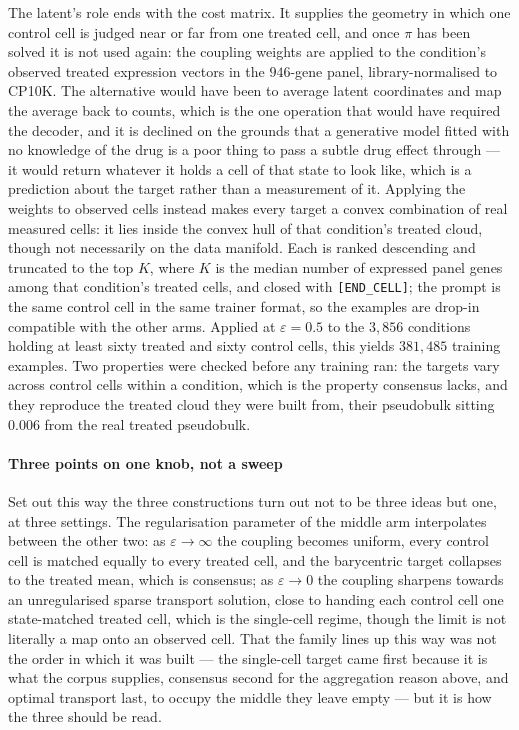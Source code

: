 The latent's role ends with the cost matrix. It supplies the geometry in which one
control cell is judged near or far from one treated cell, and once $\pi$ has been
solved it is not used again: the coupling weights are applied to the condition's
observed treated expression vectors in the $946$-gene panel, library-normalised to
CP10K. The alternative would have been to average latent coordinates and map the
average back to counts, which is the one operation that would have required the
decoder, and it is declined on the grounds that a generative model fitted with no
knowledge of the drug is a poor thing to pass a subtle drug effect through --- it
would return whatever it holds a cell of that state to look like, which is a
prediction about the target rather than a measurement of it. Applying the weights
to observed cells instead makes every target a convex combination of real measured
cells: it lies inside the convex hull of that condition's treated cloud, though not
necessarily on the data manifold. Each is ranked descending and truncated to the
top $K$, where $K$ is the median number of expressed panel genes among that
condition's treated cells, and closed with \texttt{[END\_CELL]}; the prompt is the
same control cell in the same trainer format, so the examples are drop-in
compatible with the other arms. Applied at $\varepsilon = 0.5$ to the $3{,}856$
conditions holding at least sixty treated and sixty control cells, this yields
$381{,}485$ training examples. Two properties were checked before any training ran:
the targets vary across control cells within a condition, which is the property
consensus lacks, and they reproduce the treated cloud they were built from, their
pseudobulk sitting $0.006$ from the real treated pseudobulk.

\paragraph{Three points on one knob, not a sweep} Set out this way the three
constructions turn out not to be three ideas but one, at three settings. The
regularisation parameter of the middle arm interpolates between the other two: as
$\varepsilon\rightarrow\infty$ the coupling becomes uniform, every control cell is
matched equally to every treated cell, and the barycentric target collapses to the
treated mean, which is consensus; as $\varepsilon\rightarrow 0$ the coupling
sharpens towards an unregularised sparse transport solution, close to handing each
control cell one state-matched treated cell, which is the single-cell regime,
though the limit is not literally a map onto an observed cell. That the family
lines up this way was not the order in which it was built --- the single-cell target
came first because it is what the corpus supplies, consensus second for the
aggregation reason above, and optimal transport last, to occupy the middle they
leave empty --- but it is how the three should be read.

